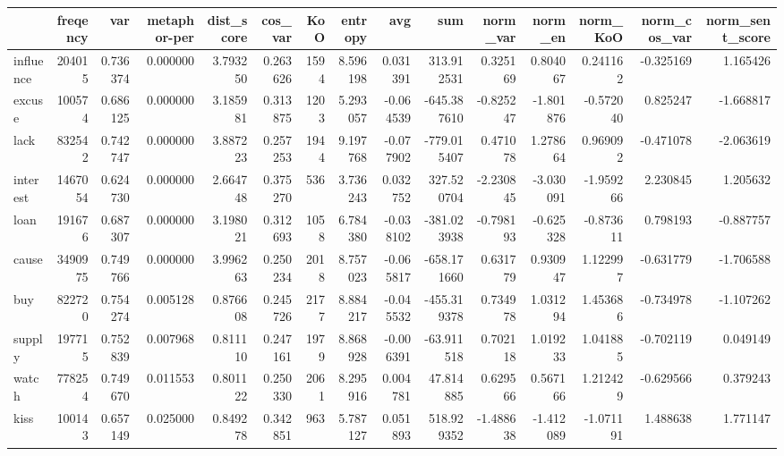 \begin{tabular}{lrrrrrrrrrrrrrr}
\toprule
{} &  freqency &       var &  metaphor-per &  dist\_score &   cos\_var &   KoO &   entropy &       avg &         sum &  norm\_var &   norm\_en &  norm\_KoO &  norm\_cos\_var &  norm\_sent\_score \\
\midrule
influence &    204015 &  0.736374 &      0.000000 &    3.793250 &  0.263626 &  1594 &  8.596198 &  0.031391 &  313.912531 &  0.325169 &  0.804067 &  0.241162 &     -0.325169 &         1.165426 \\
excuse    &    100574 &  0.686125 &      0.000000 &    3.185981 &  0.313875 &  1203 &  5.293057 & -0.064539 & -645.387610 & -0.825247 & -1.801876 & -0.572040 &      0.825247 &        -1.668817 \\
lack      &    832542 &  0.742747 &      0.000000 &    3.887223 &  0.257253 &  1944 &  9.197768 & -0.077902 & -779.015407 &  0.471078 &  1.278664 &  0.969092 &     -0.471078 &        -2.063619 \\
interest  &   1467054 &  0.624730 &      0.000000 &    2.664748 &  0.375270 &   536 &  3.736243 &  0.032752 &  327.520704 & -2.230845 & -3.030091 & -1.959266 &      2.230845 &         1.205632 \\
loan      &    191676 &  0.687307 &      0.000000 &    3.198021 &  0.312693 &  1058 &  6.784380 & -0.038102 & -381.023938 & -0.798193 & -0.625328 & -0.873611 &      0.798193 &        -0.887757 \\
cause     &   3490975 &  0.749766 &      0.000000 &    3.996263 &  0.250234 &  2018 &  8.757023 & -0.065817 & -658.171660 &  0.631779 &  0.930947 &  1.122997 &     -0.631779 &        -1.706588 \\
buy       &    822720 &  0.754274 &      0.005128 &    0.876608 &  0.245726 &  2177 &  8.884217 & -0.045532 & -455.319378 &  0.734978 &  1.031294 &  1.453686 &     -0.734978 &        -1.107262 \\
supply    &    197715 &  0.752839 &      0.007968 &    0.811110 &  0.247161 &  1979 &  8.868928 & -0.006391 &  -63.911518 &  0.702118 &  1.019233 &  1.041885 &     -0.702119 &         0.049149 \\
watch     &    778254 &  0.749670 &      0.011553 &    0.801122 &  0.250330 &  2061 &  8.295916 &  0.004781 &   47.814885 &  0.629566 &  0.567166 &  1.212429 &     -0.629566 &         0.379243 \\
kiss      &    100143 &  0.657149 &      0.025000 &    0.849278 &  0.342851 &   963 &  5.787127 &  0.051893 &  518.929352 & -1.488638 & -1.412089 & -1.071191 &      1.488638 &         1.771147 \\

\end{tabular}
